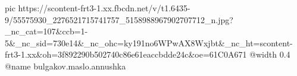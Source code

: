  
 
 
 
 

\ifcmt
  pic https://scontent-frt3-1.xx.fbcdn.net/v/t1.6435-9/55575930_2276521715741757_5158988967902707712_n.jpg?_nc_cat=107&ccb=1-5&_nc_sid=730e14&_nc_ohc=ky191no6WPwAX8Wxjbt&_nc_ht=scontent-frt3-1.xx&oh=3f892290b502740c86e61eaccbdde24c&oe=61C0A671
  @width 0.4
	@name bulgakov.maslo.annushka
\fi
